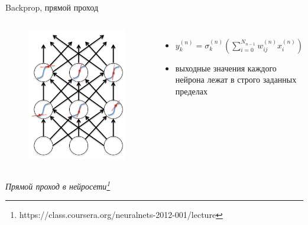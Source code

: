 \documentclass[10pt]{beamer}
\begin{document}
\begin{frame}{Backprop, прямой проход}

\begin{columns}
	\begin{figure}[h!]
		\centering
		\includegraphics[width=1\textwidth]{images/bp_f.png}
	\end{figure}
    
	\begin{itemize}
		\item $y^{(n)}_k = \sigma^{(n)}_k\left(\sum^{N_{n-1}}_{i=0} w^{(n)}_{ij}x^{(n)}_i\right)$
		\item выходные значения каждого нейрона лежат в строго заданных пределах
	\end{itemize}	
\end{columns}
\textit{Прямой проход в нейросети\footnote{https://class.coursera.org/neuralnets-2012-001/lecture}}

\end{frame}
\end{document}
